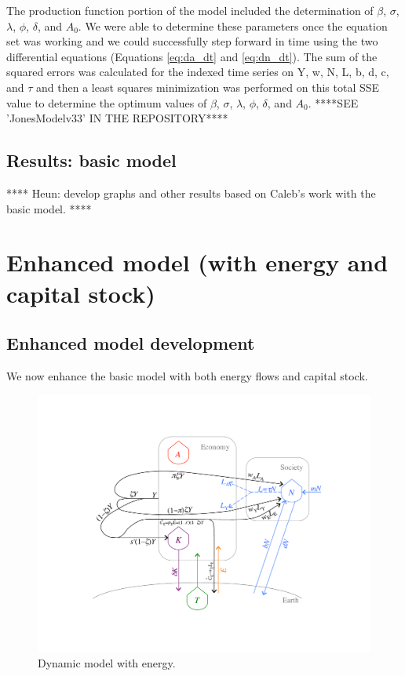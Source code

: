 \documentclass[letterpaper,12pt]{article}
\begin{document}
The production function portion of the model included the determination of $\beta$, $\sigma$, $\lambda$, $\phi$, $\delta$, and $A_\mathrm{0}$. We were able to determine these parameters once the equation set was working and we could successfully step forward in time using the two differential equations (Equations \ref{eq:da_dt} and \ref{eq:dn_dt}). The sum of the squared errors was calculated for the indexed time series on Y, w, N, L, b, d, c, and $\tau$ and then a least squares minimization was performed on this total SSE value to determine the optimum values of $\beta$, $\sigma$, $\lambda$, $\phi$, $\delta$, and $A_\mathrm{0}$.
****SEE 'JonesModelv33' IN THE REPOSITORY****


\subsection{Results: basic model}
\label{sec:Results_basic_model}

**** Heun: develop graphs and other results based on Caleb's work with the basic model. ****


\section{Enhanced model (with energy and capital stock)}
\label{sec:Enhanced_model}

\subsection{Enhanced model development}
\label{sec:enhanced_model_development}

We now enhance the basic model with both energy flows and capital stock.

\begin{figure} \label{fig:ModelWithEnergy}
  \begin{center}
    \includegraphics[width=\textwidth]{figure_other/ModelWithEnergy.pdf}
    \caption{Dynamic model with energy.}
  \end{center}
\end{figure}
\end{document}
